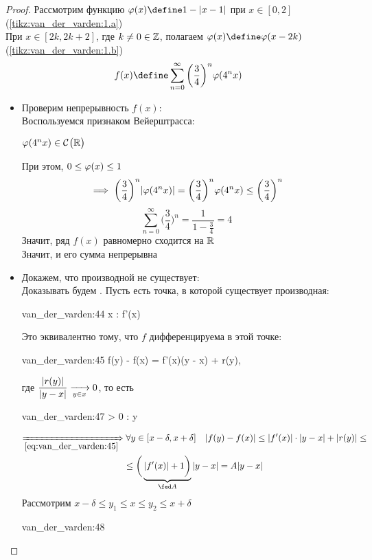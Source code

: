 \begin{proof}
	Рассмотрим функцию $ \vphi(x) \define 1 - |x - 1| $ при $ x \in [0, 2] $ (\autoref{tikz:van_der_varden:1.a}) \\
	При $ x \in [2k, 2k + 2] $, где $ k \ne 0 \in \mathbb{Z} $, полагаем $ \vphi(x) \define \vphi(x - 2k) $ (\autoref{tikz:van_der_varden:1.b})
	$$ f(x) \define \sum_{n = 0}^\infty \bigg( \frac34 \bigg)^n \vphi(4^n x) $$
	\begin{itemize}
		\item Проверим непрерывность $ f(x) $: \\
		Воспользуемся признаком Вейерштрасса:
		\begin{intuition}
			$ \varphi(4^n x) \in \mathcal{C}^{} \big( {\mathbb{R}} \big)  $
		\end{intuition}
		При этом, $ 0 \le \varphi(x) \le 1 $
		$$ \implies \bigg( \frac34 \bigg)^n |\varphi(4^n x) | = \bigg( \frac34 \bigg)^n \varphi(4^n x) \le \bigg( \frac34 \bigg)^n $$
		$$ \sum_{n = 0}^\infty \bigg( \frac34 \bigg)^n = \frac1{1 - \frac34} = 4 $$
		Значит, ряд $ f(x) $ равномерно сходится на $ \mathbb{R} $ \\
		Значит, и его сумма непрерывна
		\item Докажем, что производной не существует: \\
		Доказывать будем . Пусть есть точка, в которой существует производная:
		\begin{equ}{van_der_varden:44}
			\exist x \in \R : \quad \exist f'(x)
		\end{equ}
		Это эквивалентно тому, что $ f $ дифференцируема в этой точке:
		\begin{equ}{van_der_varden:45}
			f(y) - f(x) = f'(x)(y - x) + r(y),
		\end{equ}
		где $ \dfrac{|r(y)|}{|y - x|} \xrightarrow[y \in x]{} 0 $, то есть
		\begin{equ}{van_der_varden:47}
			\exist \delta > 0 : \quad \forall y  \quad {} 
		\end{equ}
		\begin{multline*}
			\underimp{\eref{van_der_varden:45}} \forall y \in [x - \delta, x + \delta] \quad |f(y) - f(x)| \le |f'(x)| \cdot |y - x| + |r(y)| \le \\
			\le \bigg( \underbrace{|f'(x)| + 1 \bigg)}_{\fed A}|y - x| = A|y - x|
		\end{multline*}
		Рассмотрим $ x - \delta \le y_1 \le x \le y_2 \le x + \delta $
		\begin{equ}{van_der_varden:48}
			\implies
			\begin{cases}

\end{cases}
\end{equ}
\end{itemize}
\end{proof}
